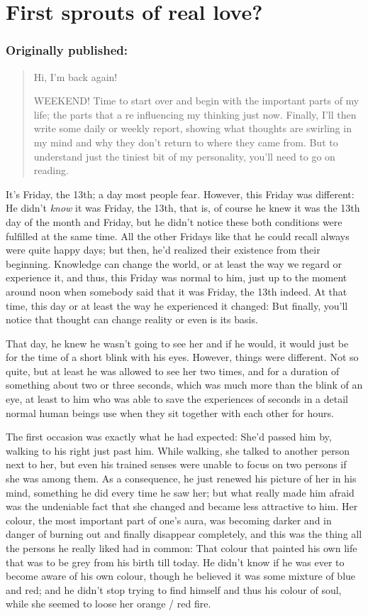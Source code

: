 \chapter{First sprouts of real love?}
\label{cha:first-sprouts-real}
\subsection*{Originally published: }
\begin{quote}
Hi, I'm back again!

WEEKEND! Time to start over and begin with the important parts of my life; the parts that a re influencing my thinking just now. Finally, I'll then write some daily or weekly report, showing what thoughts are swirling in my mind and why they don't return to where they came from. But to understand just the tiniest bit of my personality, you'll need to go on reading.
\end{quote}

It's Friday, the 13th; a day most people fear. However, this Friday was different: He didn't \emph{know} it was Friday, the 13th, that is, of course he knew it was the 13th day of the month and Friday, but he didn't notice these both conditions were fulfilled at the same time. All the other Fridays like that he could recall always were quite happy days; but then, he'd realized their existence from their beginning. Knowledge can change the world, or at least the way we regard or experience it, and thus, this Friday was normal to him, just up to the moment around noon when somebody said that it was Friday, the 13th indeed. At that time, this day or at least the way he experienced it changed: But finally, you'll notice that thought can change reality or even is its basis.

That day, he knew he wasn't going to see her and if he would, it would just be for the time of a short blink with his eyes. However, things were different. Not so quite, but at least he was allowed to see her two times, and for a duration of something about two or three seconds, which was much more than the blink of an eye, at least to him who was able to save the experiences of seconds in a detail normal human beings use when they sit together with each other for hours.

The first occasion was exactly what he had expected: She'd passed him by, walking to his right just past him. While walking, she talked to another person next to her, but even his trained senses were unable to focus on two persons if she was among them. As a consequence, he just renewed his picture of her in his mind, something he did every time he saw her; but what really made him afraid was the undeniable fact that she changed and became less attractive to him. Her colour, the most important part of one's aura, was becoming darker and in danger of burning out and finally disappear completely, and this was the thing all the persons he really liked had in common: That colour that painted his own life that was to be grey from his birth till today. He didn't know if he was ever to become aware of his own colour, though he believed it was some mixture of blue and red; and he didn't stop trying to find himself and thus his colour of soul, while she seemed to loose her orange / red fire.

